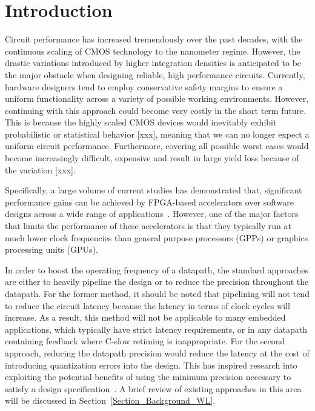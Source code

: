 \documentclass[prodmode,acmtrets]{acmsmall} %
\begin{document}
\maketitle


\section{Introduction}
Circuit performance has increased tremendously over the past decades, with the continuous scaling of CMOS technology to the nanometer regime. However, the drastic variations introduced by higher integration densities is anticipated to be the major obstacle when designing reliable, high performance circuits. Currently, hardware designers tend to employ conservative safety margins to ensure a uniform functionality across a variety of possible working environments. However, continuing with this approach could become very costly in the short term future. This is because the highly scaled CMOS devices would inevitably exhibit probabilistic or statistical behavior [xxx], meaning that we can no longer expect a uniform circuit performance. Furthermore, covering all possible worst cases would become increasingly difficult, expensive and result in large yield loss because of the variation [xxx].

Specifically, a large volume of current studies has demonstrated that, significant performance gains can be achieved by FPGA-based accelerators over software designs across a wide range of applications~\cite{UnderwoodFPGAvsCPU,David_MINRES}. However, one of the major factors that limits the performance of these accelerators is that they typically run at much lower clock frequencies than general purpose processors (GPPs) or graphics processing units (GPUs).

In order to boost the operating frequency of a datapath, the standard approaches are either to heavily pipeline the design or to reduce the precision throughout the datapath. For the former method, it should be noted that pipelining will not tend to reduce the circuit latency because the latency in terms of clock cycles will increase. As a result, this method will not be applicable to many embedded applications, which typically have strict latency requirements, or in any datapath containing feedback where C-slow retiming is inappropriate. For the second approach, reducing the datapath precision would reduce the latency at the cost of introducing quantization errors into the design. This has inspired research into exploiting the potential benefits of using the minimum precision necessary to satisfy a design specification~\cite{GeorgeDT11}. A brief review of existing approaches in this area will be discussed in Section~\ref{Section_Background_WL}.
\end{document}
